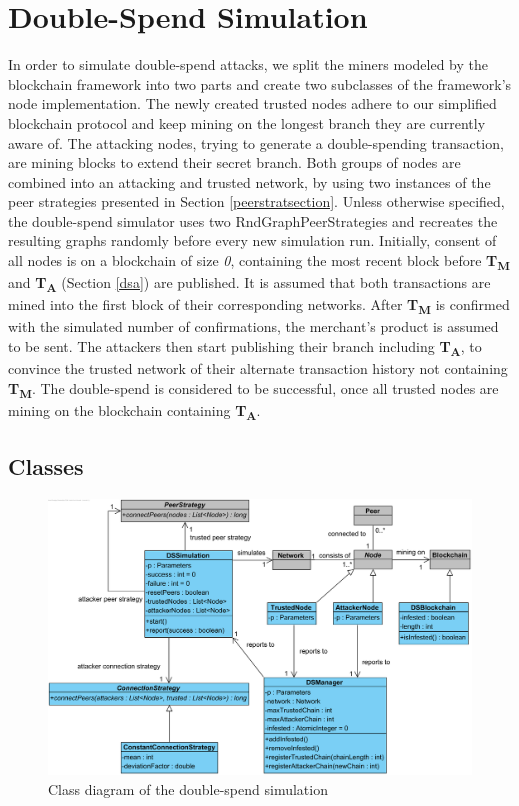 \documentclass[a4paper,12pt,twoside]{report}
\begin{document}
\section{Double-Spend Simulation}
In order to simulate double-spend attacks, we split the miners modeled by the blockchain framework into two parts and create two subclasses of the framework's node implementation. The newly created trusted nodes adhere to our simplified blockchain protocol and keep mining on the longest branch they are currently aware of. The attacking nodes, trying to generate a double-spending transaction, are mining blocks to extend their secret branch. Both groups of nodes are combined into an attacking and trusted network, by using two instances of the peer strategies presented in Section \ref{peerstratsection}. Unless otherwise specified, the double-spend simulator uses two RndGraphPeerStrategies and recreates the resulting graphs randomly before every new simulation run. Initially, consent of all nodes is on a blockchain of size \textit{0}, containing the most recent block before \textbf{T\textsubscript{M}} and \textbf{T\textsubscript{A}} (Section \ref{dsa}) are published. It is assumed that both transactions are mined into the first block of their corresponding networks. After \textbf{T\textsubscript{M}} is confirmed with the simulated number of confirmations, the merchant's product is assumed to be sent. The attackers then start publishing their branch including \textbf{T\textsubscript{A}}, to convince the trusted network of their alternate transaction history not containing \textbf{T\textsubscript{M}}. The double-spend is considered to be successful, once all trusted nodes are mining on the blockchain containing \textbf{T\textsubscript{A}}.
\subsection{Classes}
\begin{figure}[ht]
	\centering
  \includegraphics[width=\textwidth]{Simulation.png}
	\caption{Class diagram of the double-spend simulation}
	\label{simulation}
\end{figure}
\end{document}
